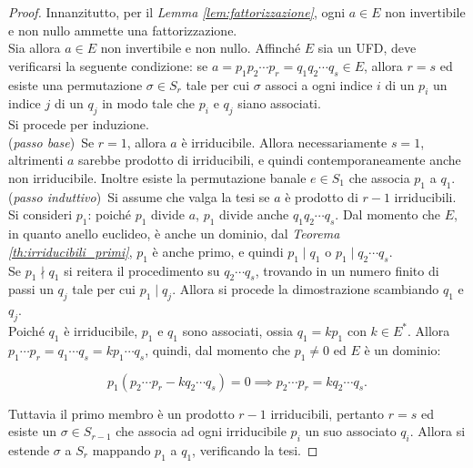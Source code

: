 \documentclass[a4paper]{article}
\begin{document}
\begin{proof}
    Innanzitutto, per il \textit{Lemma \ref{lem:fattorizzazione}}, ogni
    $a \in E$ non invertibile e non nullo ammette una fattorizzazione. \\

    Sia allora $a \in E$ non invertibile e non nullo. Affinché $E$ sia un UFD,
    deve verificarsi la seguente condizione: se
    $a=p_1p_2 \cdots p_r=q_1q_2 \cdots q_s \in E$, allora
    $r=s$ ed esiste una permutazione $\sigma \in S_r$ tale per cui
    $\sigma$ associ a ogni indice $i$ di un $p_i$ un indice $j$ di
    un $q_j$ in modo tale che $p_i$ e $q_j$ siano associati. \\

    Si procede per induzione. \\

    (\textit{passo base}) \,Se $r=1$, allora $a$ è irriducibile. Allora necessariamente
    $s=1$, altrimenti $a$ sarebbe prodotto di irriducibili, e quindi contemporaneamente
    anche non irriducibile. Inoltre esiste la permutazione banale $e \in S_1$ che
    associa $p_1$ a $q_1$. \\

    (\textit{passo induttivo}) \,Si assume che valga la tesi se $a$ è
    prodotto di $r-1$ irriducibili.
    Si consideri $p_1$: poiché $p_1$ divide $a$, $p_1$ divide anche
    $q_1q_2 \cdots q_s$. Dal momento che $E$, in quanto
    anello euclideo, è anche un dominio, dal \textit{Teorema \ref{th:irriducibili_primi}}, $p_1$ è anche primo,
    e quindi $p_1 \mid q_1$ o $p_1 \mid q_2 \cdots q_s$. \\

    Se $p_1 \nmid q_1$ si reitera il procedimento su $q_2 \cdots q_s$, trovando in
    un numero finito di passi un $q_j$ tale per cui $p_1 \mid q_j$. Allora si procede
    la dimostrazione scambiando $q_1$ e $q_j$. \\

    Poiché $q_1$ è irriducibile, $p_1$ e $q_1$ sono associati, ossia $q_1 = kp_1$ con
    $k \in E^*$. Allora $p_1 \cdots p_r = q_1 \cdots q_s = kp_1 \cdots q_s$, quindi,
    dal momento che $p_1 \neq 0$ ed $E$ è un dominio:

    \[p_1(p_2 \cdots p_r - kq_2 \cdots q_s)=0 \implies p_2 \cdots p_r = kq_2 \cdots q_s .\]

    Tuttavia il primo membro è un prodotto $r-1$ irriducibili, pertanto $r=s$ ed
    esiste un $\sigma \in S_{r-1}$ che associa ad ogni irriducibile $p_i$ un suo
    associato $q_i$. Allora si estende $\sigma$ a $S_r$ mappando $p_1$ a $q_1$,
    verificando la tesi.
\end{proof}
\end{document}
